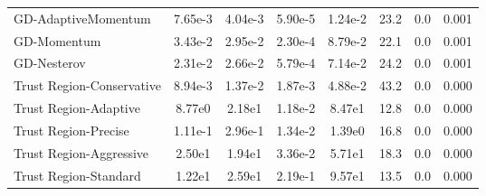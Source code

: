 \documentclass{article}
\begin{document}
\begin{table}[htbp]
{\begin{tabular}{p{2.5cm}*{7}{c}}
GD-AdaptiveMomentum & 7.65e-3 & 4.04e-3 & 5.90e-5 & 1.24e-2 & 23.2 & 0.0 & 0.001 \\
GD-Momentum & 3.43e-2 & 2.95e-2 & 2.30e-4 & 8.79e-2 & 22.1 & 0.0 & 0.001 \\
GD-Nesterov & 2.31e-2 & 2.66e-2 & 5.79e-4 & 7.14e-2 & 24.2 & 0.0 & 0.001 \\
Trust Region-Conservative & 8.94e-3 & 1.37e-2 & 1.87e-3 & 4.88e-2 & 43.2 & 0.0 & 0.000 \\
Trust Region-Adaptive & 8.77e0 & 2.18e1 & 1.18e-2 & 8.47e1 & 12.8 & 0.0 & 0.000 \\
Trust Region-Precise & 1.11e-1 & 2.96e-1 & 1.34e-2 & 1.39e0 & 16.8 & 0.0 & 0.000 \\
Trust Region-Aggressive & 2.50e1 & 1.94e1 & 3.36e-2 & 5.71e1 & 18.3 & 0.0 & 0.000 \\
Trust Region-Standard & 1.22e1 & 2.59e1 & 2.19e-1 & 9.57e1 & 13.5 & 0.0 & 0.000 \\
\bottomrule
\end{tabular}
}
\end{table}
\end{document}
